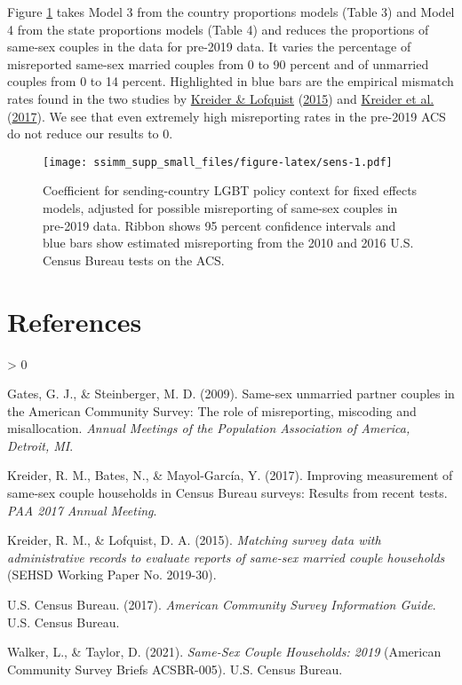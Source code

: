 \documentclass[
  11pt,
]{article}
\newlength{\cslhangindent}
\newenvironment{CSLReferences}[2] %
 {%
  \setlength{\parindent}{0pt}
  \ifodd #1 \everypar{\setlength{\hangindent}{\cslhangindent}}\ignorespaces\fi
  \ifnum #2 > 0
  \setlength{\parskip}{#2\baselineskip}
  \fi
 }%
 {}
\begin{document}
Figure \ref{fig:sens} takes Model 3 from the country proportions models (Table 3) and Model 4 from the state proportions models (Table 4) and reduces the proportions of same-sex couples in the data for pre-2019 data. It varies the percentage of misreported same-sex married couples from 0 to 90 percent and of unmarried couples from 0 to 14 percent. Highlighted in blue bars are the empirical mismatch rates found in the two studies by \protect\hyperlink{ref-kreider_2015}{Kreider \& Lofquist} (\protect\hyperlink{ref-kreider_2015}{2015}) and \protect\hyperlink{ref-kreider_2017}{Kreider et al.} (\protect\hyperlink{ref-kreider_2017}{2017}). We see that even extremely high misreporting rates in the pre-2019 ACS do not reduce our results to 0.

\begin{figure}
\centering
\texttt{[image: ssimm\_supp\_small\_files/figure-latex/sens-1.pdf]}
\caption{\label{fig:sens}Coefficient for sending-country LGBT policy context for fixed effects models, adjusted for possible misreporting of same-sex couples in pre-2019 data. Ribbon shows 95 percent confidence intervals and blue bars show estimated misreporting from the 2010 and 2016 U.S. Census Bureau tests on the ACS.}
\end{figure}

\newpage

\hypertarget{references}{%
\section{References}\label{references}}

\setlength{\parindent}{-0.2in}
\setlength{\leftskip}{0.2in}
\setlength{\parskip}{8pt}

\noindent

\hypertarget{refs}{}
\begin{CSLReferences}{1}{0}
\leavevmode\hypertarget{ref-gates_2009}{}%
Gates, G. J., \& Steinberger, M. D. (2009). Same-sex unmarried partner couples in the {American Community Survey}: {The} role of misreporting, miscoding and misallocation. \emph{Annual Meetings of the Population Association of America, Detroit, {MI}}.

\leavevmode\hypertarget{ref-kreider_2017}{}%
Kreider, R. M., Bates, N., \& Mayol-García, Y. (2017). Improving measurement of same-sex couple households in {Census Bureau} surveys: {Results} from recent tests. \emph{{PAA} 2017 Annual Meeting}.

\leavevmode\hypertarget{ref-kreider_2015}{}%
Kreider, R. M., \& Lofquist, D. A. (2015). \emph{Matching survey data with administrative records to evaluate reports of same-sex married couple households} (SEHSD Working Paper No. 2019-30).

\leavevmode\hypertarget{ref-u.s.censusbureau_2017}{}%
U.S. Census Bureau. (2017). \emph{American {Community Survey Information Guide}}. {U.S. Census Bureau}.

\leavevmode\hypertarget{ref-walker_2021}{}%
Walker, L., \& Taylor, D. (2021). \emph{Same-{Sex Couple Households}: 2019} (American Community Survey Briefs ACSBR-005). {U.S. Census Bureau}.

\end{CSLReferences}
\end{document}
